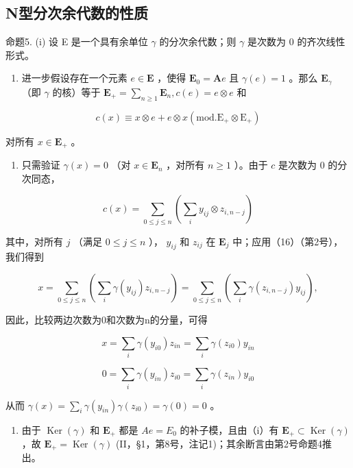 \subsection{N型分次余代数的性质}

命题5. (i) 设 E 是一个具有余单位 \(\gamma\) 的分次余代数；则 \(\gamma\) 是次数为 0 的齐次线性形式。

\begin{enumerate}
\def\labelenumi{(\roman{enumi})}
\setcounter{enumi}{1}
\tightlist
\item
  进一步假设存在一个元素 \(e \in \mathbf{E}\) ，使得 \(\mathbf{E}_0 = \mathbf{A}e\) 且 \(\gamma(e) = 1\) 。那么 \(\mathbf{E}_{\gamma}\) （即 \(\gamma\) 的核）等于 \(\mathbf{E}_{+} = \sum_{n \geqslant 1} \mathbf{E}_n, c(e) = e \otimes e\) 和
\end{enumerate}

\[
c (x) \equiv x \otimes e + e \otimes x (\mathrm{mod.} \mathrm{E} _ {+} \otimes \mathrm{E} _ {+})\tag{19}
\]

对所有 \(x \in \mathbf{E}_{+}\) 。

\begin{enumerate}
\def\labelenumi{(\roman{enumi})}
\tightlist
\item
  只需验证 \(\gamma(x) = 0\) （对 \(x \in \mathbf{E}_n\) ，对所有 \(n \geqslant 1\) ）。由于 \(c\) 是次数为 0 的分次同态，
\end{enumerate}

\[
c (x) = \sum_ {0 \leqslant j \leqslant n} \left(\sum_ {i} y _ {i j} \otimes z _ {i, n - j}\right)\tag{20}
\]

其中，对所有 \(j\) （满足 \(0 \leqslant j \leqslant n\) ）， \(y_{ij}\) 和 \(z_{ij}\) 在 \(\mathbf{E}_j\) 中；应用（16）（第2号），我们得到

\[
x = \sum_ {0 \leqslant j \leqslant n} \left(\sum_ {i} \gamma (y _ {i j}) z _ {i, n - j}\right) = \sum_ {0 \leqslant j \leqslant n} \left(\sum_ {i} \gamma (z _ {i, n - j}) y _ {i j}\right),
\]

因此，比较两边次数为0和次数为n的分量，可得

\[
x = \sum_ {i} \gamma (y _ {i 0}) z _ {i n} = \sum_ {i} \gamma (z _ {i 0}) y _ {i n}
\]

\[
0 = \sum_ {i} \gamma (y _ {i n}) z _ {i 0} = \sum_ {i} \gamma (z _ {i n}) y _ {i 0}
\]

从而 \(\gamma(x) = \sum_{i} \gamma(y_{in})\gamma(z_{i0}) = \gamma(0) = 0\) 。

\begin{enumerate}
\def\labelenumi{(\roman{enumi})}
\setcounter{enumi}{1}
\tightlist
\item
  由于 \(\operatorname{Ker}(\gamma)\) 和 \(\mathbf{E}_{+}\) 都是 \(Ae = E_0\) 的补子模，且由（i）有 \(\mathbf{E}_{+} \subset \operatorname{Ker}(\gamma)\) ，故 \(\mathbf{E}_{+} = \operatorname{Ker}(\gamma)\) (II，§1，第8号，注记1)；其余断言由第2号命题4推出。
\end{enumerate}

